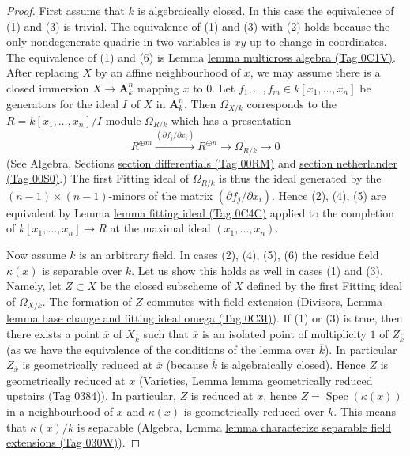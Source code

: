 \documentclass{amsart}
\theoremstyle{plain}
\theoremstyle{definition}
\theoremstyle{remark}
\numberwithin{equation}{subsection}
\def\Spec{\mathop{\mathrm{Spec}}}
\begin{document}
\begin{proof}
First assume that $k$ is algebraically closed.
In this case the equivalence of (1) and (3) is trivial.
The equivalence of (1) and (3) with (2) holds because the only
nondegenerate quadric in two variables is $xy$ up to change in
coordinates. The equivalence of (1) and (6) is 
Lemma \href{https://stacks.math.columbia.edu/tag/0C1V}{lemma multicross algebra (Tag 0C1V)}.
After replacing $X$ by an affine neighbourhood
of $x$, we may assume there is a closed immersion $X \to \mathbf{A}^n_k$
mapping $x$ to $0$. Let $f_1, \ldots, f_m \in k[x_1, \ldots, x_n]$
be generators for the ideal $I$ of $X$ in $\mathbf{A}^n_k$.
Then $\Omega_{X/k}$ corresponds to the $R = k[x_1, \ldots, x_n]/I$-module
$\Omega_{R/k}$ which has a presentation
$$
R^{\oplus m} \xrightarrow{(\partial f_j/\partial x_i)}
R^{\oplus n} \to \Omega_{R/k} \to 0
$$
(See Algebra, Sections \href{https://stacks.math.columbia.edu/tag/00RM}{section differentials (Tag 00RM)} and
\href{https://stacks.math.columbia.edu/tag/00S0}{section netherlander (Tag 00S0)}.)
The first Fitting ideal of $\Omega_{R/k}$ is thus the ideal
generated by the $(n - 1) \times (n - 1)$-minors of the
matrix $(\partial f_j/\partial x_i)$. Hence (2), (4), (5)
are equivalent by Lemma \href{https://stacks.math.columbia.edu/tag/0C4C}{lemma fitting ideal (Tag 0C4C)} applied
to the completion of $k[x_1, \ldots, x_n] \to R$
at the maximal ideal $(x_1, \ldots, x_n)$.

\medskip\noindent
Now assume $k$ is an arbitrary field.
In cases (2), (4), (5), (6) the residue field $\kappa(x)$ is
separable over $k$. Let us show this holds as well
in cases (1) and (3). Namely, let $Z \subset X$ be the closed subscheme
of $X$ defined by the first Fitting ideal of $\Omega_{X/k}$.
The formation of $Z$ commutes with field extension
(Divisors, Lemma \href{https://stacks.math.columbia.edu/tag/0C3I}{lemma base change and fitting ideal omega (Tag 0C3I)}).
If (1) or (3) is true, then there exists a point
$\overline{x}$ of $X_{\overline{k}}$ such that $\overline{x}$
is an isolated point of multiplicity $1$ of $Z_{\overline{k}}$ (as we have the
equivalence of the conditions of the lemma over $\overline{k}$).
In particular $Z_{\overline{x}}$ is geometrically reduced at $\overline{x}$
(because $\overline{k}$ is algebraically closed). Hence
$Z$ is geometrically reduced at $x$
(Varieties, Lemma \href{https://stacks.math.columbia.edu/tag/0384}{lemma geometrically reduced upstairs (Tag 0384)}).
In particular, $Z$ is reduced at $x$, hence $Z = \Spec(\kappa(x))$
in a neighbourhood of $x$ and $\kappa(x)$ is geometrically reduced
over $k$. This means that $\kappa(x)/k$ is separable
(Algebra, Lemma \href{https://stacks.math.columbia.edu/tag/030W}{lemma characterize separable field extensions (Tag 030W)}).


\end{proof}
\end{document}

